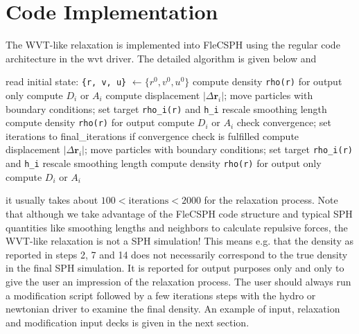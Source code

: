 \documentclass{article}
\begin{document}
\section{Code Implementation}
The WVT-like relaxation is implemented into FleCSPH using the regular code architecture in the wvt driver.  
The detailed algorithm is given below and 
\begin{algorithm}
\caption{WVT relaxation}
\label{alg:wvt}
\begin{algorithmic}[1]
\State read initial state: {\tt \{r, v, u\}} $\leftarrow \{r^0, v^0, u^0\}$
\State compute density {\tt rho(r)} for output only
\State compute $D_i$ or $A_i$
\State compute displacement $|\Delta \mathbf{r}_i|$; move particles with boundary conditions; set target {\tt rho\_i(r)} and {\tt h\_i} 
\State rescale smoothing length 
\State compute density {\tt rho(r)} for output 
\State compute $D_i$ or $A_i$
\State check convergence; set iterations to final\_iterations if convergence check is fulfilled
\EndWhile
{}
\State compute displacement $|\Delta \mathbf{r}_i|$; move particles with boundary conditions; set target {\tt rho\_i(r)} and {\tt h\_i} 
\State rescale smoothing length 
\State compute density {\tt rho(r)} for output only
\State compute $D_i$ or $A_i$
\EndWhile
\end{algorithmic}
\end{algorithm}
it usually takes about $100 < \mathrm{iterations} < 2000$ for the relaxation process. 
Note that although we take advantage of the FleCSPH code structure and typical SPH quantities like smoothing lengths and neighbors to calculate repulsive forces, the WVT-like relaxation is not a SPH simulation! 
This means e.g. that the density as reported in steps 2, 7 and 14 does not necessarily correspond to the true density in the final SPH simulation. 
It is reported for output purposes only and only to give the user an impression of the relaxation process. 
The user should always run a modification script followed by a few iterations steps with the hydro or newtonian driver to examine the final density. 
An example of input, relaxation and modification input decks is given in the next section. 
\end{document}
